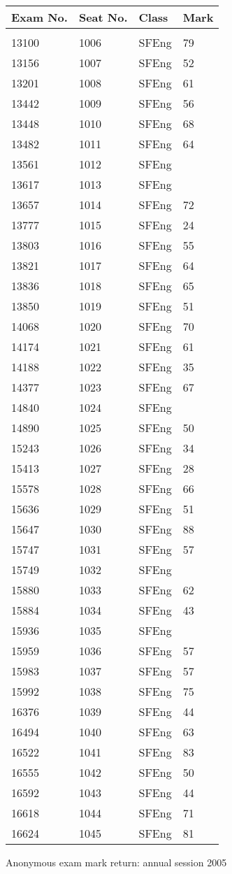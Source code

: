 \documentclass[a4paper]{article}
\begin{document}
\begin{tabular}{llll}
Exam No.&Seat No.&Class&Mark\\[3pt]
 \hline\\[3pt]
13100&1006&SFEng&79\\
13156&1007&SFEng&52\\
13201&1008&SFEng&61\\
13442&1009&SFEng&56\\
13448&1010&SFEng&68\\
13482&1011&SFEng&64\\
13561&1012&SFEng&\\
13617&1013&SFEng&\\
13657&1014&SFEng&72\\
13777&1015&SFEng&24\\
13803&1016&SFEng&55\\
13821&1017&SFEng&64\\
13836&1018&SFEng&65\\
13850&1019&SFEng&51\\
14068&1020&SFEng&70\\
14174&1021&SFEng&61\\
14188&1022&SFEng&35\\
14377&1023&SFEng&67\\
14840&1024&SFEng&\\
14890&1025&SFEng&50\\
15243&1026&SFEng&34\\
15413&1027&SFEng&28\\
15578&1028&SFEng&66\\
15636&1029&SFEng&51\\
15647&1030&SFEng&88\\
15747&1031&SFEng&57\\
15749&1032&SFEng&\\
15880&1033&SFEng&62\\
15884&1034&SFEng&43\\
15936&1035&SFEng&\\
15959&1036&SFEng&57\\
15983&1037&SFEng&57\\
15992&1038&SFEng&75\\
16376&1039&SFEng&44\\
16494&1040&SFEng&63\\
16522&1041&SFEng&83\\
16555&1042&SFEng&50\\
16592&1043&SFEng&44\\
16618&1044&SFEng&71\\
16624&1045&SFEng&81\\
\end{tabular}
\newpage
\begin{center}
Anonymous exam mark return: annual session 2005
\end{center}
\end{document}
